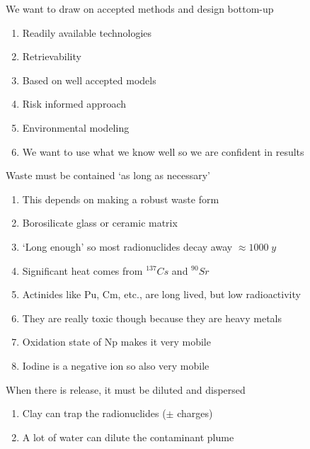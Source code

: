 \documentclass[aspectratio=1610,pdftex,dvipsnames,compress,xcolor={dvipsnames}]{beamer}
\begin{document}
\begin{frame}{We want to draw on accepted methods and design bottom-up}
    \begin{enumerate}[series=outerlist,topsep=0pt,itemsep=21pt,leftmargin=*,label=(\arabic*)]
        \item[]Readily available technologies
        \item[]Retrievability
        \item[]Based on well accepted models
        \item[]Risk informed approach
        \item[]Environmental modeling
        \item[]We want to use what we know well so we are confident in results
    \end{enumerate}
\end{frame}


\begin{frame}{Waste must be contained `as long as necessary'}
    \begin{enumerate}[series=outerlist,topsep=0pt,itemsep=15pt,leftmargin=*,label=(\arabic*)]
        \item[]This depends on making a robust waste form 
        \item[]Borosilicate glass or ceramic matrix
        \item[]`Long enough' so most radionuclides decay away $\approx 1000 \; y$
        \item[]Significant heat comes from $^{137}Cs$ and $^{90}Sr$
        \item[]Actinides like Pu, Cm, etc., are long lived, but low radioactivity
        \item[]They are really toxic though because they are heavy metals
        \item[]Oxidation state of Np makes it very mobile
        \item[]Iodine is a negative ion so also very mobile
    \end{enumerate}
\end{frame}


\begin{frame}{When there is release, it must be diluted and dispersed}
    \begin{enumerate}[series=outerlist,topsep=0pt,itemsep=21pt,leftmargin=*,label=(\arabic*)]
        \item[]Clay can trap the radionuclides ($\pm$ charges)
        \item[]A lot of water can dilute the contaminant plume
    \end{enumerate}
\end{frame}
\end{document}
